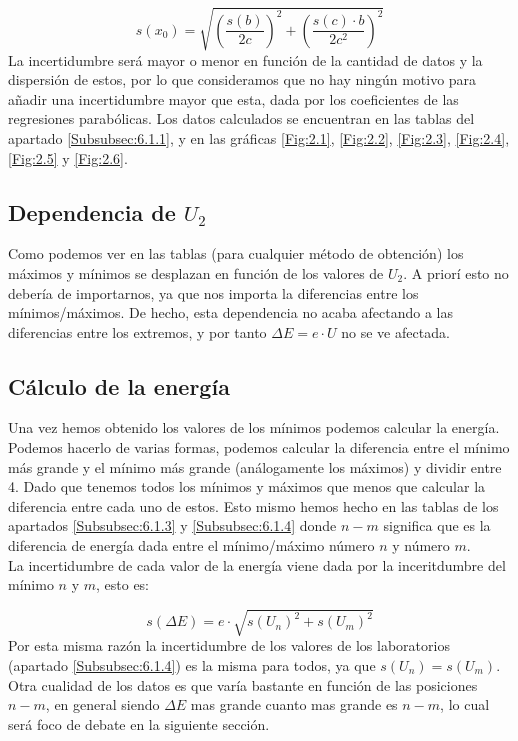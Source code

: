 \documentclass[12pt,a4paper]{article}
\numberwithin{equation}{section}
\numberwithin{figure}{section}
\newcommand{\parentesis}[1]{\left( #1  \right)}
\begin{document}
\begin{equation}
s(x_0) = \sqrt{\parentesis{\frac{s(b)}{2c}}^2 + \parentesis{\frac{s(c)\cdot b}{2c^2}}^2}
\end{equation}
La incertidumbre será mayor o menor en función de la cantidad de datos y la dispersión de estos, por lo que consideramos que no hay ningún motivo para añadir una incertidumbre mayor que esta, dada por los coeficientes de las regresiones parabólicas. Los datos calculados se encuentran en las tablas del apartado \ref{Subsubsec:6.1.1}, y en las gráficas \ref{Fig:2.1}, \ref{Fig:2.2}, \ref{Fig:2.3}, \ref{Fig:2.4}, \ref{Fig:2.5} y \ref{Fig:2.6}.

\subsection{Dependencia de $U_2$}

Como podemos ver en las tablas (para cualquier método de obtención) los máximos y mínimos se desplazan en función de los valores de $U_2$. A priorí esto  no debería de importarnos, ya que nos importa la diferencias entre los mínimos/máximos. De hecho, esta dependencia no acaba afectando a las diferencias entre los extremos, y por tanto $\Delta E = e \cdot U$ no se ve afectada. 

\subsection{Cálculo de la energía}

Una vez hemos obtenido los valores de los mínimos podemos calcular la energía. Podemos hacerlo de varias formas, podemos calcular la diferencia entre el mínimo más grande y el mínimo más grande (análogamente los máximos) y dividir entre 4. Dado que tenemos todos los mínimos y máximos que menos que calcular la diferencia entre cada uno de estos. Esto mismo hemos hecho en las tablas de los apartados \ref{Subsubsec:6.1.3} y \ref{Subsubsec:6.1.4} donde $n-m$ significa que es la diferencia de energía dada entre el mínimo/máximo número $n$ y número $m$. \\

La incertidumbre de cada valor de la energía viene dada por la inceritdumbre del mínimo $n$ y $m$, esto es:

\begin{equation}
s(\Delta E) = e \cdot \sqrt{s(U_{n})^2+s(U_{m})^2}
\end{equation}
Por esta misma razón la incertidumbre de los valores de los laboratorios (apartado \ref{Subsubsec:6.1.4}) es la misma para todos, ya que $s(U_n)=s(U_m)$. Otra cualidad de los datos es que varía bastante en función de las posiciones $n-m$, en general siendo $\Delta E$ mas grande cuanto mas grande es $n-m$, lo cual será foco de debate en la siguiente sección.
\end{document}
